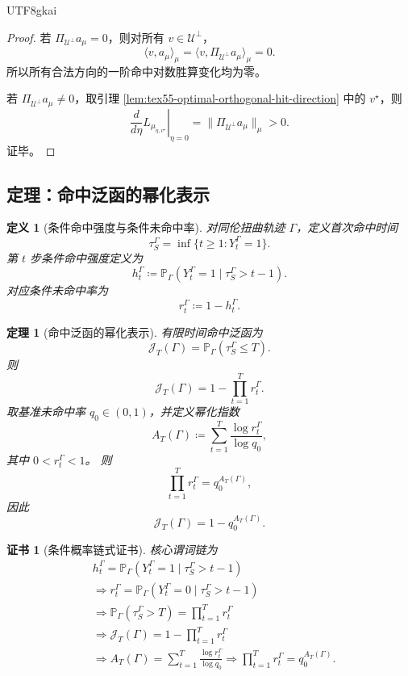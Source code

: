 \documentclass[12pt]{article}
\newtheorem{definition}{定义}[section]
\newtheorem{theorem}{定理}[section]
\newtheorem{Certificate}{证书}[section]
\newcommand{\DefEq}{\coloneqq}
\begin{document}
\begin{CJK*}{UTF8}{gkai}
\begin{proof}
若 \(\Pi_{\mathcal U^\perp}a_\mu=0\)，则对所有 \(v\in\mathcal U^\perp\)，
\[
  \langle v,a_\mu\rangle_\mu
  =
  \langle v,\Pi_{\mathcal U^\perp}a_\mu\rangle_\mu
  =
  0.
\]
所以所有合法方向的一阶命中对数胜算变化均为零。

若 \(\Pi_{\mathcal U^\perp}a_\mu\neq0\)，取引理
\ref{lem:tex55-optimal-orthogonal-hit-direction} 中的 \(v^\star\)，则
\[
  \left.
  \frac{d}{d\eta}
  L_{\mu_{\eta,v^\star}}
  \right|_{\eta=0}
  =
  \lVert\Pi_{\mathcal U^\perp}a_\mu\rVert_\mu
  >
  0.
\]
证毕。
\end{proof}

\subsection{定理：命中泛函的幂化表示}
\label{subsec:tex55-power-form}

\begin{definition}[条件命中强度与条件未命中率]
\label{def:tex55-conditional-hit-power}
对同伦扭曲轨迹 \(\Gamma\)，定义首次命中时间
\[
  \tau_S^\Gamma
  =
  \inf\{t\ge1:Y_t^\Gamma=1\}.
\]
第 \(t\) 步条件命中强度定义为
\[
  h_t^\Gamma
  \DefEq
  \mathbb P_\Gamma
  \left(
  Y_t^\Gamma=1
  \mid
  \tau_S^\Gamma>t-1
  \right).
\]
对应条件未命中率为
\[
  r_t^\Gamma
  \DefEq
  1-h_t^\Gamma.
\]
\end{definition}

\begin{theorem}[命中泛函的幂化表示]
\label{thm:tex55-power-hit-functional}
有限时间命中泛函为
\[
  \mathcal J_T(\Gamma)
  =
  \mathbb P_\Gamma(\tau_S^\Gamma\le T).
\]
则
\[
  \boxed{
  \mathcal J_T(\Gamma)
  =
  1-
  \prod_{t=1}^{T}r_t^\Gamma.
  }
\]
取基准未命中率 \(q_0\in(0,1)\)，并定义幂化指数
\[
  A_T(\Gamma)
  \DefEq
  \sum_{t=1}^{T}
  \frac{\log r_t^\Gamma}{\log q_0},
\]
其中 \(0<r_t^\Gamma<1\)。
则
\[
  \prod_{t=1}^{T}r_t^\Gamma
  =
  q_0^{A_T(\Gamma)},
\]
因此
\[
  \boxed{
  \mathcal J_T(\Gamma)
  =
  1-q_0^{A_T(\Gamma)}.
  }
\]
\end{theorem}

\begin{Certificate}[条件概率链式证书]
\label{cert:tex55-power-hit-functional}
核心谓词链为
\[
\begin{aligned}
  &h_t^\Gamma
  =
  \mathbb P_\Gamma(Y_t^\Gamma=1\mid\tau_S^\Gamma>t-1)\\
  &\Longrightarrow
  r_t^\Gamma
  =
  \mathbb P_\Gamma(Y_t^\Gamma=0\mid\tau_S^\Gamma>t-1)\\
  &\Longrightarrow
  \mathbb P_\Gamma(\tau_S^\Gamma>T)
  =
  \prod_{t=1}^{T}r_t^\Gamma\\
  &\Longrightarrow
  \mathcal J_T(\Gamma)
  =
  1-\prod_{t=1}^{T}r_t^\Gamma\\
  &\Longrightarrow
  A_T(\Gamma)
  =
  \sum_{t=1}^{T}
  \frac{\log r_t^\Gamma}{\log q_0}
  \Longrightarrow
  \prod_{t=1}^{T}r_t^\Gamma=q_0^{A_T(\Gamma)}.
\end{aligned}
\]
\end{Certificate}


\end{CJK*}
\end{document}
